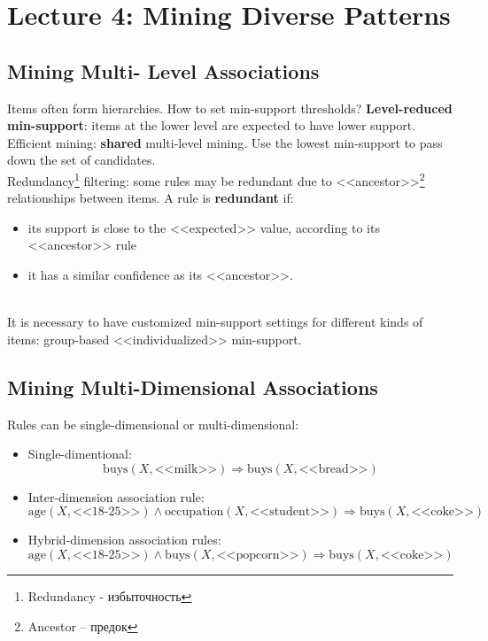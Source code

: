 \section{Lecture 4: Mining Diverse Patterns}

\subsection{Mining Multi- Level Associations}

Items often form hierarchies. How to set min-support thresholds? \textbf{Level-reduced min-support}: items at the lower level are expected to have lower support.\\

Efficient mining: \textbf{shared} multi-level mining. Use the lowest min-support to pass down the set of candidates.\\

Redundancy\footnote{Redundancy - избыточность} filtering: some rules may be redundant due to <<ancestor>>\footnote{Ancestor -- предок} relationships between items. A rule is \textbf{redundant} if:
\begin{itemize}
\item its support is close to the <<expected>> value, according to its <<ancestor>> rule
\item it has a similar confidence as its <<ancestor>>.
\end{itemize}\\

It is necessary to have customized min-support settings for different kinds of items: group-based <<individualized>> min-support.

\subsection{Mining Multi-Dimensional Associations}
Rules can be single-dimensional or multi-dimensional:
\begin{itemize}
\item Single-dimentional: 
\begin{equation*}
\mathrm{buys}(X, \text{<<milk>>}) \Rightarrow \mathrm{buys}(X, \text{<<bread>>})
\end{equation*}
\item Inter-dimension association rule: 
\begin{equation*}
\mathrm{age}(X, \text{<<18-25>>}) \wedge \mathrm{occupation}(X, \text{<<student>>}) \Rightarrow \mathrm{buys}(X, \text{<<coke>>})
\end{equation*}
\item Hybrid-dimension association rules: 
\begin{equation*}
\mathrm{age}(X, \text{<<18-25>>}) \wedge \mathrm{buys}(X, \text{<<popcorn>>}) \Rightarrow \mathrm{buys}(X, \text{<<coke>>})
\end{equation*}
\end{itemize}


